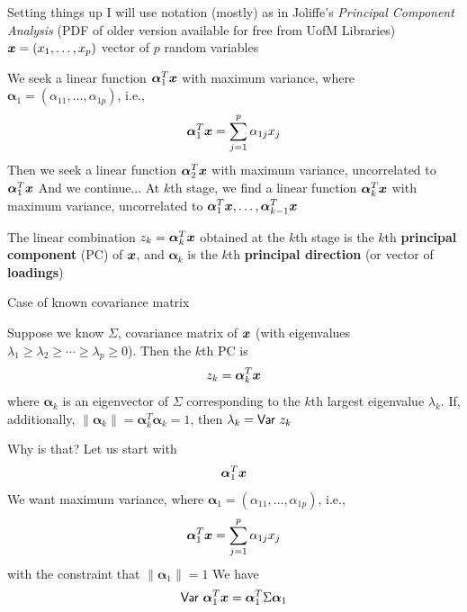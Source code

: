 \documentclass[aspectratio=169]{beamer}\usepackage[]{graphicx}\usepackage[]{xcolor}
\begin{document}


\begin{frame}{Setting things up}
I will use notation (mostly) as in Joliffe's \emph{Principal Component Analysis} (PDF of older version available for free from UofM Libraries)
\vfill
$\bm{x}=(x_1,\ldots,x_p)$ vector of $p$ random variables
\end{frame}


\begin{frame} 
We seek a linear function $\bm{\alpha}_1^T\bm{x}$ with maximum variance, where $\bm{\alpha}_1=(\alpha_{11},\ldots,\alpha_{1p})$, i.e.,
\[
\bm{\alpha}_1^T\bm{x} = \sum_{j=1}^p\alpha_{1j}x_j
\]
\vfill
Then we seek a linear function $\bm{\alpha}_2^T\bm{x}$ with maximum variance, uncorrelated to $\bm{\alpha}_1^T\bm{x}$
\vfill
And we continue...
\vfill
At $k$th stage, we find a linear function $\bm{\alpha}_k^T\bm{x}$ with maximum variance, uncorrelated to $\bm{\alpha}_1^T\bm{x},\ldots,\bm{\alpha}_{k-1}^T\bm{x}$
\vfill
\begin{importantdefinition}
The linear combination $z_k = \bm{\alpha}_k^T\bm{x}$ obtained at the $k$th stage is the $k$th \textbf{principal component} (PC) of $\bm{x}$, and $\bm{\alpha}_k$ is the $k$th \textbf{principal direction} (or vector of \textbf{loadings})
\end{importantdefinition}
\end{frame}

\begin{frame}{Case of known covariance matrix}
\begin{importanttheorem}
\label{th:pca-eigen}
Suppose we know $\Sigma$, covariance matrix of $\bm{x}$ (with eigenvalues $\lambda_1 \ge \lambda_2 \ge \cdots \ge \lambda_p \ge 0$). Then the $k$th PC is 
\[
z_k=\bm{\alpha}_k^T\bm{x}
\]
where $\bm{\alpha}_k$ is an eigenvector of $\Sigma$ corresponding to the $k$th largest eigenvalue $\lambda_k$. If, additionally, $\|\bm{\alpha}_k\|=\bm{\alpha}_k^T\bm{\alpha}_k=1$, then $\lambda_k=\mathsf{Var}\  z_k$
\end{importanttheorem}
\end{frame}


\begin{frame}{Why is that?}
Let us start with
\[
\bm{\alpha}_1^T\bm{x}
\]
\vfill
We want maximum variance, where $\bm{\alpha}_1=(\alpha_{11},\ldots,\alpha_{1p})$, i.e.,
\[
\bm{\alpha}_1^T\bm{x} = \sum_{j=1}^p\alpha_{1j}x_j
\]
with the constraint that $\|\bm{\alpha}_1\|=1$
\vfill
We have
\[
\mathsf{Var}\  \bm{\alpha}_1^T\bm{x}
=\bm{\alpha}_1^T\Sigma\bm{\alpha}_1
\]
\end{frame}
\end{document}
